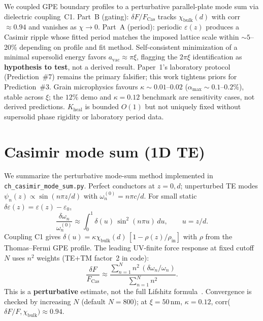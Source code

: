 \documentclass[11pt,a4paper]{article}
\begin{document}
We coupled GPE boundary profiles to a perturbative parallel-plate mode sum via dielectric coupling~C1.
Part~B (gating): $\delta F/F_{\mathrm{Cas}}$ tracks $\chi_{\mathrm{bulk}}(d)$ with corr $\approx 0.94$ and vanishes as $\chi \to 0$.
Part~A (period): periodic $\varepsilon(z)$ produces a Casimir ripple whose fitted period matches the imposed lattice scale within $\sim 5$--20\%
depending on profile and fit method.
Self-consistent minimization of a minimal supersolid energy favors $a_{\mathrm{vac}} \approx \pi\xi$, flagging the $2\pi\xi$ identification as
\textbf{hypothesis to test}, not a derived result.
Paper~1's laboratory protocol (Prediction~\#7) remains the primary falsifier; this work tightens priors for Prediction~\#3.
Grain microphysics favours $\kappa \sim 0.01$--$0.02$ ($\alpha_{\max} \sim 0.1$--$0.2\%$), stable across $\xi$; the $12\%$ demo and $\kappa=0.12$ benchmark are sensitivity cases, not derived predictions.
$K_{\mathrm{heal}}$ is bounded $O(1)$ but not uniquely fixed without supersolid phase rigidity or laboratory period data.

\printbibliography

\appendix

\section{Casimir mode sum (1D TE)}
\label{app:modesum}

We summarize the perturbative mode-sum method implemented in \texttt{ch\_casimir\_mode\_sum.py}.
Perfect conductors at $z=0,d$; unperturbed TE modes $\psi_n(z)\propto\sin(n\pi z/d)$ with $\omega_n^{(0)}=n\pi c/d$.
For small static $\delta\varepsilon(z)=\varepsilon(z)-\varepsilon_0$,
\begin{equation}
  \frac{\delta\omega_n}{\omega_n^{(0)}}
  \approx \int_0^1 \delta(u)\,\sin^2(n\pi u)\,du,
  \qquad u=z/d.
\end{equation}
Coupling C1 gives $\delta(u)=\kappa\chi_{\mathrm{bulk}}(d)\,[1-\rho(z)/\rho_{\mathrm{in}}]$ with $\rho$ from the Thomas--Fermi GPE profile.
The leading UV-finite force response at fixed cutoff $N$ uses $n^2$ weights (TE+TM factor~2 in code):
\begin{equation}
  \frac{\delta F}{F_{\mathrm{Cas}}}
  \approx \frac{\sum_{n=1}^{N} n^2\,(\delta\omega_n/\omega_n)}{\sum_{n=1}^{N} n^2}.
  \label{eq:app-modesum}
\end{equation}
This is a \textbf{perturbative} estimate, not the full Lifshitz formula~\cite{Lifshitz1956}.
Convergence is checked by increasing $N$ (default $N=800$); at $\xi=50$\,nm, $\kappa=0.12$, corr($\delta F/F,\chi_{\mathrm{bulk}})\approx 0.94$.
\end{document}
